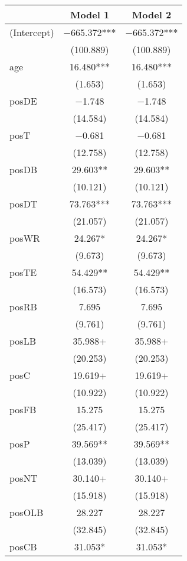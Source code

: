\documentclass[12pt,english]{article}
\begin{document}
\begin{table}[ht]
\centering
\small
\begin{tabular}{lcc}
\toprule
  & Model 1 & Model 2\\
\midrule
(Intercept) & \num{-665.372}*** & \num{-665.372}***\\
 & (\num{100.889}) & (\num{100.889})\\
age & \num{16.480}*** & \num{16.480}***\\
 & (\num{1.653}) & (\num{1.653})\\
posDE & \num{-1.748} & \num{-1.748}\\
 & (\num{14.584}) & (\num{14.584})\\
posT & \num{-0.681} & \num{-0.681}\\
 & (\num{12.758}) & (\num{12.758})\\
posDB & \num{29.603}** & \num{29.603}**\\
 & (\num{10.121}) & (\num{10.121})\\
posDT & \num{73.763}*** & \num{73.763}***\\
 & (\num{21.057}) & (\num{21.057})\\
posWR & \num{24.267}* & \num{24.267}*\\
 & (\num{9.673}) & (\num{9.673})\\
posTE & \num{54.429}** & \num{54.429}**\\
 & (\num{16.573}) & (\num{16.573})\\
posRB & \num{7.695} & \num{7.695}\\
 & (\num{9.761}) & (\num{9.761})\\
posLB & \num{35.988}+ & \num{35.988}+\\
 & (\num{20.253}) & (\num{20.253})\\
posC & \num{19.619}+ & \num{19.619}+\\
 & (\num{10.922}) & (\num{10.922})\\
posFB & \num{15.275} & \num{15.275}\\
 & (\num{25.417}) & (\num{25.417})\\
posP & \num{39.569}** & \num{39.569}**\\
 & (\num{13.039}) & (\num{13.039})\\
posNT & \num{30.140}+ & \num{30.140}+\\
 & (\num{15.918}) & (\num{15.918})\\
posOLB & \num{28.227} & \num{28.227}\\
 & (\num{32.845}) & (\num{32.845})\\
posCB & \num{31.053}* & \num{31.053}*\\

\end{tabular}
\end{table}
\end{document}
